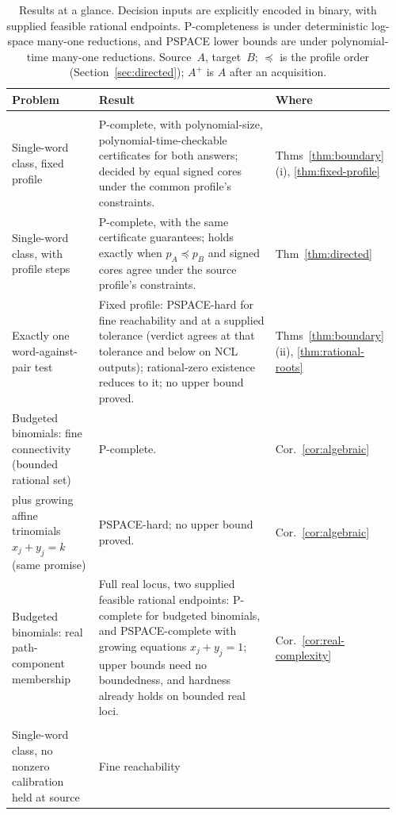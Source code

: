 \begin{table}[tp]
\caption{Results at a glance. Decision inputs are explicitly encoded in
binary, with supplied feasible rational endpoints. P-completeness is under
deterministic log-space many-one reductions, and PSPACE lower bounds are
under polynomial-time many-one reductions. Source~$A$, target~$B$; $\preceq$
is the profile order (Section~\ref{sec:directed}); $A^+$ is $A$ after an
acquisition.}\label{tab:results}
\footnotesize\setlength{\tabcolsep}{4pt}\renewcommand{\arraystretch}{0.88}
\begin{tabular}{@{}>{\raggedright\arraybackslash}p{0.25\linewidth}p{0.60\linewidth}p{0.11\linewidth}@{}}
\toprule
Problem & Result & Where\\
\midrule
\multicolumn{3}{@{}l}{\emph{Main results}}\\[2pt]
Single-word class, fixed profile & P-complete, with polynomial-size,
polynomial-time-checkable certificates for both answers; decided by equal
signed cores under the common profile's constraints. &
Thms~\ref{thm:boundary}(i), \ref{thm:fixed-profile}\\
Single-word class, with profile steps & P-complete, with the same certificate
guarantees; holds exactly when $p_A\preceq p_B$ and signed cores agree under
the source profile's constraints. & Thm~\ref{thm:directed}\\
Exactly one word-against-pair test & Fixed profile: PSPACE-hard for fine
reachability and at a supplied tolerance (verdict agrees at that tolerance
and below on NCL outputs); rational-zero existence reduces to it; no upper
bound proved. & Thms~\ref{thm:boundary}(ii), \ref{thm:rational-roots}\\
Budgeted binomials: fine connectivity (bounded rational set) & P-complete. &
Cor.~\ref{cor:algebraic}\\
\quad plus growing affine trinomials $x_j+y_j=k$ (same promise) &
PSPACE-hard; no upper bound proved. & Cor.~\ref{cor:algebraic}\\
Budgeted binomials: real path-component membership & Full real locus, two
supplied feasible rational endpoints: P-complete for budgeted binomials, and
PSPACE-complete with growing equations $x_j+y_j=1$; upper bounds need no
boundedness, and hardness already holds on bounded real loci. &
Cor.~\ref{cor:real-complexity}\\[3pt]
\multicolumn{3}{@{}l}{\emph{Further results}}\\[2pt]
Single-word class, no nonzero calibration held at source & Fine reachability

\end{tabular}
\end{table}
